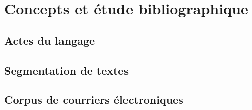
\chapter{Concepts et étude bibliographique}

\label{ch:background_and_related_work}

\section{Actes du langage}


\section{Segmentation de textes}


\section{Corpus de courriers électroniques}

